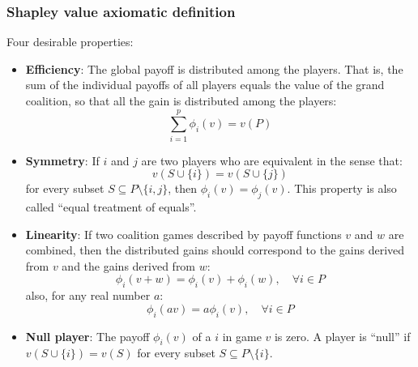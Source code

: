\subsubsection{Shapley value axiomatic definition}

Four desirable properties:
\begin{itemize}
	\item \textbf{Efficiency}: The global payoff is distributed among the players.
	      That is, the sum of the individual payoffs of all players equals the value of the grand
	      coalition, so that all the gain is distributed among the players:
	      \begin{equation*}
		      \sum_{i=1}^p \phi_i(v) = v(P)
	      \end{equation*}

	\item \textbf{Symmetry}: If $i$ and $j$ are two players who are equivalent
	      in the sense that:
	      \begin{equation*}
		      v(S \cup \{i\}) = v(S \cup \{j\})
	      \end{equation*}
	      for every subset $S \subseteq P \setminus \{i,j\}$, then $\phi_i(v) = \phi_j(v)$.
	      This property is also called ``equal treatment of equals''.

	\item \textbf{Linearity}: If two coalition games described by payoff functions
	      $v$ and $w$ are combined, then the distributed gains should correspond to the gains
	      derived from $v$ and the gains derived from $w$:
	      \begin{equation*}
		      \phi_i(v + w) = \phi_i(v) + \phi_i(w),\quad \forall i \in P
	      \end{equation*}
	      also, for any real number $a$:
	      \begin{equation*}
		      \phi_i(av) = a \phi_i(v),\quad \forall i \in P
	      \end{equation*}

	\item \textbf{Null player}: The payoff $\phi_i(v)$ of a  $i$ in game $v$ is zero.
	      A player is ``null'' if $v(S \cup \{i\}) = v(S)$ for every subset $S \subseteq P \setminus \{i\}$.

\end{itemize}

